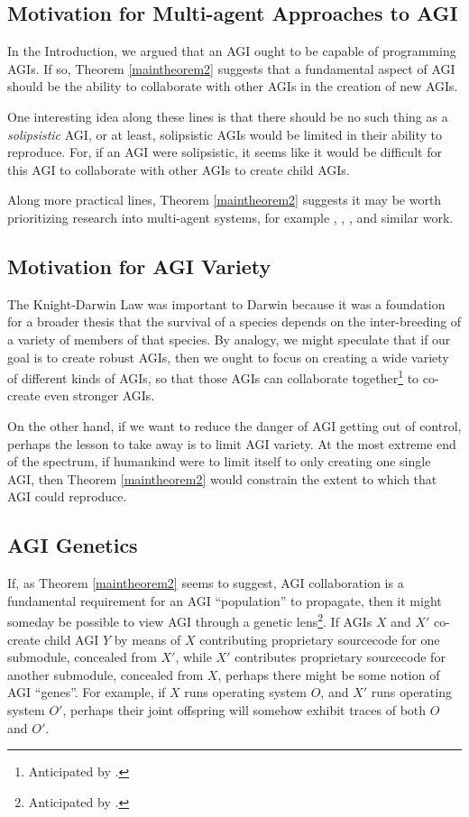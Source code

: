 \documentclass[runningheads]{llncs}
\begin{document}
\subsection{Motivation for Multi-agent Approaches to AGI}

In the Introduction, we argued that an AGI ought to be
capable of programming AGIs. If so, Theorem \ref{maintheorem2} suggests
that a fundamental aspect of AGI should be the ability to collaborate with other
AGIs in the creation of new AGIs.

One interesting idea along these lines is that there should be no
such thing as a \emph{solipsistic} AGI, or at least, solipsistic AGIs would be
limited in their ability to reproduce.
For, if an AGI were solipsistic, it
seems like it would be difficult for this AGI to collaborate with other AGIs
to create child AGIs.

Along more practical lines, Theorem \ref{maintheorem2} suggests it may be worth
prioritizing research into multi-agent systems, for example
\cite{bansal2017emergent}, \cite{hibbard2011societies}, \cite{lazaridou2018emergence},
and similar work.

\subsection{Motivation for AGI Variety}

The Knight-Darwin Law was important to
Darwin because it was a foundation for a broader thesis that the survival of a
species depends on the inter-breeding of a variety of members of that species.
By analogy, we might speculate that if our goal is to create robust AGIs, then
we ought to focus on creating a wide variety of different kinds of AGIs, so that
those AGIs can collaborate together\footnote{Anticipated
by \cite{dai2011artificial}.} to co-create even stronger AGIs.

On the other hand, if we want to reduce the danger of AGI getting out of control,
perhaps the lesson to take away is to limit AGI variety. At the most extreme end
of the spectrum, if humankind were to limit itself to only creating one single
AGI, then Theorem \ref{maintheorem2} would constrain the extent to which
that AGI could reproduce.


\subsection{AGI Genetics}

If, as Theorem \ref{maintheorem2} seems to suggest, AGI collaboration
is a fundamental requirement for an AGI ``population'' to propagate, then it might
someday be possible to view AGI through a genetic lens\footnote{Anticipated
by \cite{buchanan1988artificial}.}. If AGIs $X$ and $X'$ co-create child AGI $Y$ by
means of $X$ contributing proprietary sourcecode for one submodule, concealed from $X'$,
while $X'$ contributes proprietary sourcecode for another submodule, concealed from $X$,
perhaps there might be some notion of AGI ``genes''. For example, if $X$ runs operating
system $O$, and $X'$ runs operating system $O'$, perhaps their joint offspring
will somehow exhibit traces of both $O$ and $O'$.
\end{document}
